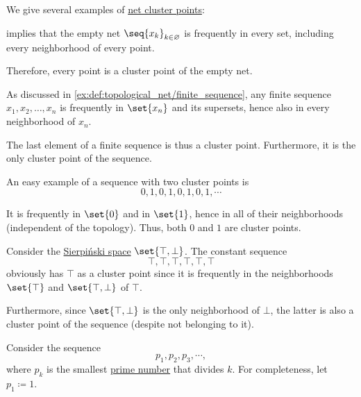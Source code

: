 \begin{example}\label{ex:def:net_cluster_point}
  We give several examples of \hyperref[def:net_cluster_point]{net cluster points}:

  \begin{thmenum}
      implies that the empty net \( \seq{ x_k }_{k \in \varnothing} \) is frequently in every set, including every neighborhood of every point.

    Therefore, every point is a cluster point of the empty net.

     As discussed in \cref{ex:def:topological_net/finite_sequence}, any finite sequence \( x_1, x_2, \ldots, x_n \) is frequently in \( \set{ x_n } \) and its supersets, hence also in every neighborhood of \( x_n \).

    The last element of a finite sequence is thus a cluster point. Furthermore, it is the only cluster point of the sequence.

     An easy example of a sequence with two cluster points is
    \begin{equation*}
      0, 1, 0, 1, 0, 1, 0, 1, \cdots
    \end{equation*}

    It is frequently in \( \set{ 0 } \) and in \( \set{ 1 } \), hence in all of their neighborhoods (independent of the topology). Thus, both \( 0 \) and \( 1 \) are cluster points.

     Consider the \hyperref[def:sierpinski_space]{Sierpi\'nski space} \( \set{ \top, \bot } \). The constant sequence
    \begin{equation*}
      \top, \top, \top, \top, \top, \top
    \end{equation*}
    obviously has \( \top \) as a cluster point since it is frequently in the neighborhoods \( \set{ \top } \) and \( \set{ \top, \bot } \) of \( \top \).

    Furthermore, since \( \set{ \top, \bot } \) is the only neighborhood of \( \bot \), the latter is also a cluster point of the sequence (despite not belonging to it).

     Consider the sequence
    \begin{equation*}
      p_1, p_2, p_3, \cdots,
    \end{equation*}
    where \( p_k \) is the smallest \hyperref[def:prime_number]{prime number} that divides \( k \). For completeness, let \( p_1 \coloneqq 1 \).


\end{thmenum}
\end{example}
